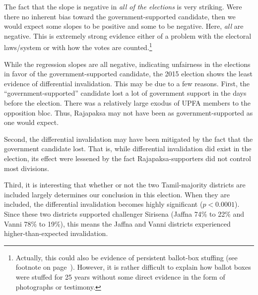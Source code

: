 The fact that the slope is negative in \emph{all of the elections} is very striking. Were there no inherent bias toward the government-supported candidate, then we would expect some slopes to be positive and some to be negative. Here, \emph{all} are negative. This is extremely strong evidence either of a problem with the electoral laws/system or with how the votes are counted.\footnote{Actually, this could also be evidence of persistent ballot-box stuffing (see footnote on page~\pageref{fn:reg-ballotboxstuffing}). However, it is rather difficult to explain how ballot boxes were stuffed for 25 years without some direct evidence in the form of photographs or testimony.}

While the regression slopes are all negative, indicating unfairness in the elections in favor of the government-supported candidate, the 2015 election shows the least evidence of differential invalidation. This may be due to a few reasons. First, the ``government-supported'' candidate lost a lot of government support in the days before the election. There was a relatively large exodus of UPFA members to the opposition bloc. \cite{tamilnet-2014} Thus, Rajapaksa may not have been as government-supported as one would expect.

Second, the differential invalidation may have been mitigated by the fact that the government candidate lost. That is, while differential invalidation did exist in the election, its effect were lessened by the fact Rajapaksa-supporters did not control most divisions.

Third, it is interesting that whether or not the two Tamil-majority districts are included largely determines our conclusion in this election. When they are included, the differential invalidation becomes highly significant ($p < 0.0001$). Since these two districts supported challenger Sirisena (Jaffna 74\% to 22\% and Vanni 78\% to 19\%), this means the Jaffna and Vanni districts experienced higher-than-expected invalidation.
























